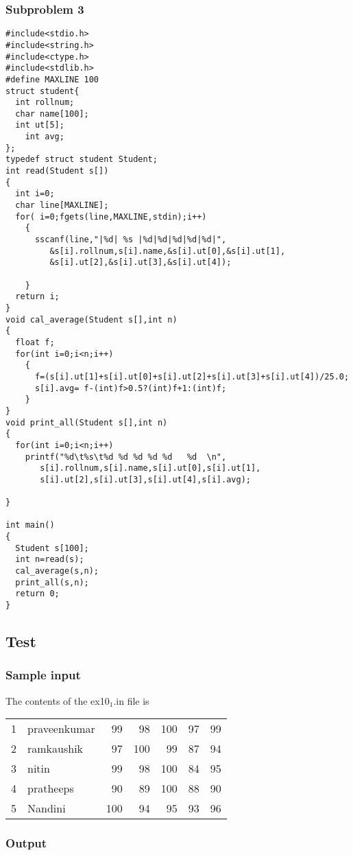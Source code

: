 \documentclass[11pt]{article}
\begin{document}
\subsubsection*{Subproblem 3}
\label{sec-2-3-1}
\begin{verbatim}
#include<stdio.h>
#include<string.h>
#include<ctype.h>
#include<stdlib.h>
#define MAXLINE 100
struct student{
  int rollnum;
  char name[100];
  int ut[5];
    int avg; 
};
typedef struct student Student;
int read(Student s[])
{
  int i=0;
  char line[MAXLINE];
  for( i=0;fgets(line,MAXLINE,stdin);i++)
    {
      sscanf(line,"|%d| %s |%d|%d|%d|%d|%d|",
	     &s[i].rollnum,s[i].name,&s[i].ut[0],&s[i].ut[1],
	     &s[i].ut[2],&s[i].ut[3],&s[i].ut[4]);

    }
  return i;
}
void cal_average(Student s[],int n)
{
  float f;
  for(int i=0;i<n;i++)
    {
      f=(s[i].ut[1]+s[i].ut[0]+s[i].ut[2]+s[i].ut[3]+s[i].ut[4])/25.0;
      s[i].avg= f-(int)f>0.5?(int)f+1:(int)f;
    }
}
void print_all(Student s[],int n)
{
  for(int i=0;i<n;i++)
	printf("%d\t%s\t%d %d %d %d %d   %d  \n",
	   s[i].rollnum,s[i].name,s[i].ut[0],s[i].ut[1],
	   s[i].ut[2],s[i].ut[3],s[i].ut[4],s[i].avg);

}

int main()
{
  Student s[100];
  int n=read(s);
  cal_average(s,n);
  print_all(s,n); 
  return 0;
}
\end{verbatim}
\subsection*{Test}
\label{sec-2-4}
\subsubsection*{Sample input}
\label{sec-2-4-1}
The contents of the ex10$_{\text{1}}$.in file is
\begin{center}
\begin{tabular}{rlrrrrr}
1 & praveenkumar & 99 & 98 & 100 & 97 & 99\\
2 & ramkaushik & 97 & 100 & 99 & 87 & 94\\
3 & nitin & 99 & 98 & 100 & 84 & 95\\
4 & pratheeps & 90 & 89 & 100 & 88 & 90\\
5 & Nandini & 100 & 94 & 95 & 93 & 96\\
\end{tabular}
\end{center}


\subsubsection*{Output}
\label{sec-2-4-2}
\end{document}
